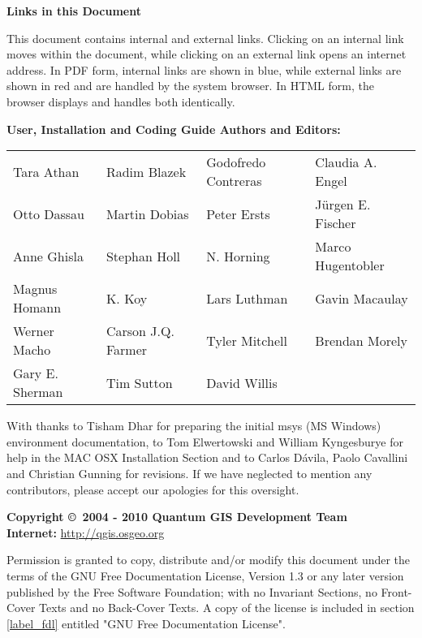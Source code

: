 \textbf{Links in this Document}

This document contains internal and external links.  Clicking on an
internal link moves within the document, while clicking on an external link
opens an internet address.  In PDF form, internal links are shown in blue,
while external links are shown in red and are handled by the
system browser. In HTML form, the browser displays and handles both
identically. 

\begin{flushleft}
\textbf{User, Installation and Coding Guide Authors and Editors:}
 
\begin{tabular}{p{4cm} p{4cm} p{4cm} p{4cm}}
Tara Athan & Radim Blazek & Godofredo Contreras & Claudia A. Engel \\
Otto Dassau & Martin Dobias & Peter Ersts & J\"urgen E. Fischer \\
Anne Ghisla & Stephan Holl & N. Horning & Marco Hugentobler  \\
Magnus Homann & K. Koy & Lars Luthman & Gavin Macaulay\\ 
Werner Macho & Carson J.Q. Farmer & Tyler Mitchell & Brendan Morely\\
Gary E. Sherman & Tim Sutton & David Willis \\
\end{tabular}

With thanks to Tisham Dhar for preparing the initial msys (MS Windows)
environment documentation, to Tom Elwertowski and William Kyngesburye for
help in the MAC OSX Installation Section and to Carlos D\'{a}vila, Paolo
Cavallini and Christian Gunning for revisions. If we have neglected to 
mention any contributors, please accept our apologies for this oversight.

\textbf{Copyright \copyright~2004 - 2010 Quantum GIS Development Team} \\
\textbf{Internet:} \url{http://qgis.osgeo.org}
\end{flushleft}

\newpage


Permission is granted to copy, distribute and/or modify this document under 
the terms of the GNU Free Documentation License, Version 1.3 or any later 
version published by the Free Software Foundation; with no Invariant 
Sections, no Front-Cover Texts and no Back-Cover Texts.  A copy of the 
license is included in section \ref{label_fdl} entitled "GNU Free Documentation 
License".

